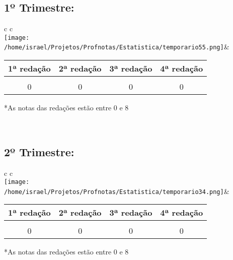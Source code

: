 \documentclass{article}%
\begin{document}
\subsection*{1º Trimestre:}%
\label{subsec:1Trimestre}%
\begin{tabular}{c c}%
\\%
\texttt{[image: /home/israel/Projetos/Profnotas/Estatistica/temporario55.png]}&\begin{minipage}[b]{0.49\textwidth}%
\begin{tabular}[b]{c | c | c | c}%
\textbf{1ª redação}&\textbf{2ª redação}&\textbf{3ª redação}&\textbf{4ª redação}\\%
\hline%
&&&\\%
0&0&0&0\\%
\end{tabular}%
\newline%
\newline%
*As notas das redações estão entre 0 e 8%
\newline%
\newline%
\newline%
\end{minipage}\\%
\end{tabular}

%
\subsection*{2º Trimestre:}%
\label{subsec:2Trimestre}%
\begin{tabular}{c c}%
\\%
\texttt{[image: /home/israel/Projetos/Profnotas/Estatistica/temporario34.png]}&\begin{minipage}[b]{0.49\textwidth}%
\begin{tabular}[b]{c | c | c | c}%
\textbf{1ª redação}&\textbf{2ª redação}&\textbf{3ª redação}&\textbf{4ª redação}\\%
\hline%
&&&\\%
0&0&0&0\\%
\end{tabular}%
\newline%
\newline%
*As notas das redações estão entre 0 e 8%
\newline%
\newline%
\newline%
\end{minipage}\\%
\end{tabular}
\end{document}
